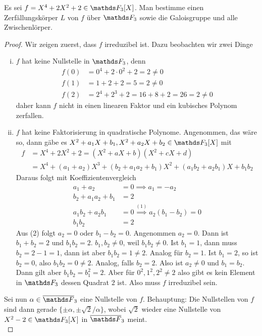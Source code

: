 Es sei $f=X^4+2X^2+2\in \F_3[X]$. Man bestimme einen Zerfällungskörper 
$L$ von $f$ über $\F_3$ sowie die Galoisgruppe und alle Zwischenlörper.
\begin{proof}
    Wir zeigen zuerst, dass $f$ irreduzibel ist. Dazu beobachten wir zwei Dinge 
    \begin{enumerate}[(i)]
        \item $f$ hat keine Nullstelle in $\F_3$, denn 
        \begin{align*}
            f(0) &= 0^4+2\cdot 0^2 + 2 = 2 \neq 0 \\
            f(1) &= 1+2+2 = 5 = 2 \neq 0 \\
            f(2) &= 2^4+2^3+2 = 16+8+2 = 26 = 2\neq 0
        \end{align*}
        daher kann $f$ nicht in einen linearen Faktor und ein kubisches Polynom zerfallen. 
        \item $f$ hat keine Faktorisierung in quadratische Polynome. Angenommen, das wäre so, dann gäbe es $X^2+a_1X+b_1, X^2+a_2X+b_2\in \F_3[X]$ mit 
        \begin{align*}
            f &= X^4+2X^2+2 = (X^2+aX+b)(X^2+cX+d) \\
              &= X^4 +(a_1+a_2)X^3 + (b_2+a_1a_2+b_1)X^2 + (a_1b_2+a_2b_1)X + b_1b_2     
        \end{align*}
        Daraus folgt mit Koeffizientenvergleich
        \begin{align*}
            a_1 + a_2 &= 0 \implies a_1 = -a_2 \tag{1}\\
            b_2+a_1a_2+b_1 &= 2 \\
            a_1b_2 + a_2b_1 &= 0 \overset{(1)}{\implies} a_2(b_1-b_2) = 0 \tag{2}\\
            b_1b_2 &= 2
        \end{align*}
        Aus (2) folgt $a_2=0$ oder $b_1-b_2=0$. Angenommen $a_2 = 0$. Dann ist $b_1+b_2=2$ und $b_1b_2=2$. $b_1,b_2\neq 0$, weil $b_1b_2\neq 0$. Ist $b_1 = 1$, dann muss $b_2 = 2-1=1$, dann ist aber $b_1b_2=1\neq 2$. Analog für $b_2=1$. Ist $b_1=2$, so ist $b_2=0$, also $b_1b_2 = 0\neq 2$. Analog, falls $b_2=2$. Also 
        ist $a_2\neq 0$ und $b_1=b_2$. Dann gilt aber $b_1b_2 = b_1^2=2$. Aber für $0^2,1^2,2^2\neq 2$ also gibt es kein Element in $\F_3$ dessen Quadrat $2$ ist. Also muss $f$ irreduzibel sein.
    \end{enumerate}
    Sei nun $\alpha\in\overline{\F}_3$ eine Nullstelle von $f$. Behauptung: Die Nullstellen von $f$ sind dann gerade $\{\pm\alpha, \pm\sqrt{2}/\alpha\}$, wobei $\sqrt{2}$ wieder eine Nullstelle von $X^2-2\in \F_3[X]$ in $\overline{\F}_3$ meint. \\

\end{proof}

